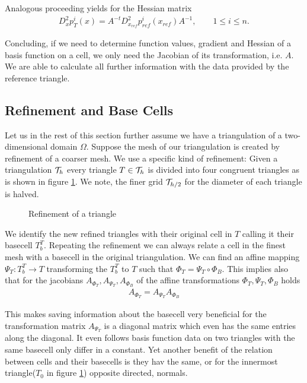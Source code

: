 \begin{definition} 
\begin{example}
Analogous proceeding yields for the Hessian matrix
\begin{align}
D_x^2p_T^i(x) = A^{-t} D_{x_{ref}}^2p^i_{ref}(x_{ref})  A^{-1}, \qquad 1 \leq i \leq n.
\end{align}

Concluding, if we need to determine function values, gradient and Hessian of a basis function on a cell, we only need the Jacobian of its transformation, i.e. $A$. We are able to calculate all further information with the data provided by the reference triangle.
\end{example}

\subsection{Refinement and Base Cells}\label{subsec: refinement and base cells}
Let us in the rest of this section further assume we have a triangulation of a two-dimensional domain $\Omega$. 
Suppose the mesh of our triangulation is created by refinement of a coarser mesh. We use a specific kind of refinement: Given a triangulation $\mathcal{T}_h$ every triangle $T \in \mathcal{T}_h$ is divided into four congruent triangles as is shown in figure \ref{pic: refinement}. We note, the finer grid $\mathcal{T}_{h/2}$ for the diameter of each triangle is halved.

\begin{figure}[h]

\caption{Refinement of a triangle}
 \label{pic: refinement}
\end{figure}

We identify the new refined triangles with their original cell in $T$ calling it their basecell $T^T_b$. Repeating the refinement we can always relate a cell in the finest mesh with a basecell in the original triangulation. We can find an affine mapping $\Psi_T:T^T_b \rightarrow T$ transforming the $T^T_b$ to $T$ such that $\Phi_T = \Psi_T \circ \Phi_B$. This implies also that for the jacobians $A_{\Phi_T}, A_{\Psi_T}, A_{\Phi_B}$ of the affine transformations $\Phi_T, \Psi_T,\Phi_B$ holds
\begin{align}
A_{\Phi_T}=A_{\Psi_T} A_{\Phi_B}
\end{align} 

This makes saving information about the basecell very beneficial for the transformation matrix $A_{\Psi_T}$ is a diagonal matrix which even has the same entries along the diagonal. It even follows basis function data on two triangles with the same basecell only differ in a constant. Yet another benefit of the relation between cells and their basecells is they hav the same, or for the innermost triangle($T_0$ in figure \ref{pic: refinement}) opposite directed, normals.


\end{definition}
